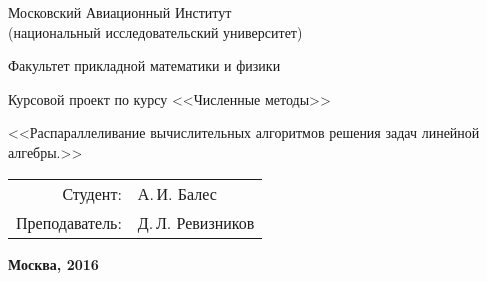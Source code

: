 \begin{titlepage}
\begin{center} %

\bfseries

	{\Large Московский Авиационный Институт \\
	(национальный исследовательский университет)
	
	} %

\vspace{48pt}


	{\large Факультет прикладной математики и физики
	
	}




\vspace{48pt}

	 Курсовой проект по курсу <<Численные методы>>

\vspace{12pt}

	{\Large <<Распараллеливание вычислительных алгоритмов решения задач линейной алгебры.>> 
	}

\end{center} %

\vspace{60pt}

	\begin{flushright}
		\begin{tabular}{rl}
			Студент: & А.\,И. Балес \\
			Преподаватель: & Д.\,Л. Ревизников \\
		\end{tabular}
	\end{flushright}

\vfill

	\begin{center} %
		\bfseries
		Москва, 2016
	\end{center}
	
\end{titlepage} 